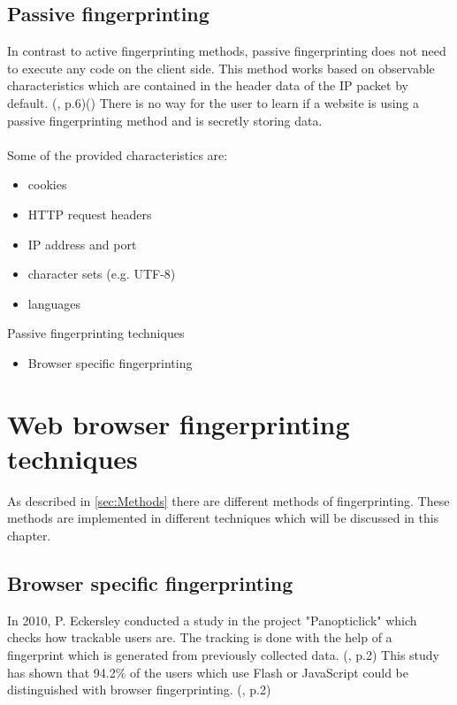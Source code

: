 \subsection{Passive fingerprinting}
In contrast to active fingerprinting methods, passive fingerprinting does not need to execute any code on the client side. This method works based on observable characteristics which are contained in the header data of the IP packet by default. (\textcite{doty18}, p.6)(\textcite{web17}) There is no way for the user to learn if a website is using a passive fingerprinting method and is secretly storing data.\\\\
Some of the provided characteristics are:
\begin{itemize}
	\item cookies
	\item HTTP request headers
	\item IP address and port
	\item character sets (e.g. UTF-8)
	\item languages\\
\end{itemize}
Passive fingerprinting techniques
\begin{itemize}
	\item Browser specific fingerprinting
\end{itemize}

\section{Web browser fingerprinting techniques}

As described in \autoref{sec:Methods} there are different methods of fingerprinting. These methods are implemented in different techniques which will be discussed in this chapter.
\subsection{Browser specific fingerprinting}
In 2010, P. Eckersley conducted a study in the project "Panopticlick" which checks how trackable users are. The tracking is done with the help of a fingerprint which is generated from previously collected data. (\textcite{upi15}, p.2) This study has shown that 94.2\% of the users which use Flash or JavaScript could be distinguished with browser fingerprinting. (\textcite{eckersley10}, p.2)

